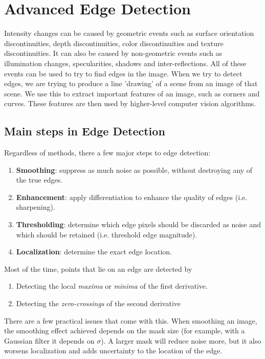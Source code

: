 \documentclass{article}
\begin{document}
	\section{Advanced Edge Detection}
	Intensity changes can be caused by geometric events such as surface orientation discontinuities, depth discontinuities, color discontinuities and texture discontinuities. It can also be caused by non-geometric events such as illumination changes, specularities, shadows and inter-reflections. All of these events can be used to try to find edges in the image. When we try to detect edges, we are trying to produce a line 'drawing' of a scene from an image of that scene. We use this to extract important features of an image, such as corners and curves. These features are then used by higher-level computer vision algorithms.
	
	\subsection{Main steps in Edge Detection}
	Regardless of methods, there a few major steps to edge detection:
		\begin{enumerate}
			\item \textbf{Smoothing}: suppress as much noise as possible, without destroying any of the true edges.
			\item \textbf{Enhancement}: apply differentiation to enhance the quality of edges (i.e. sharpening).
			\item \textbf{Thresholding}: determine which edge pixels should be discarded as  noise and which should be retained (i.e. threshold edge magnitude).
			
			\item \textbf{Localization}: determine the exact edge location.
		\end{enumerate}

	\par
	Most of the time, points that lie on an edge are detected by 
		\begin{enumerate}
			\item Detecting the local \textit{maxima} or \textit{minima} of the first derivative.
			\item Detecting the \textit{zero-crossings} of the second derivative
		\end{enumerate}
		
	There are a few practical issues that come with this. When smoothing an image, the smoothing effect achieved depends on the mask size (for example, with a Gaussian filter it depends on $\sigma$). A larger mask will reduce noise more, but it also worsens localization and adds uncertainty to the location of the edge.
	
\end{document}
